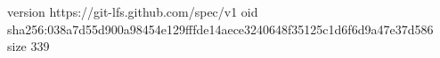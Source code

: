 version https://git-lfs.github.com/spec/v1
oid sha256:038a7d55d900a98454e129fffde14aece3240648f35125c1d6f6d9a47e37d586
size 339

